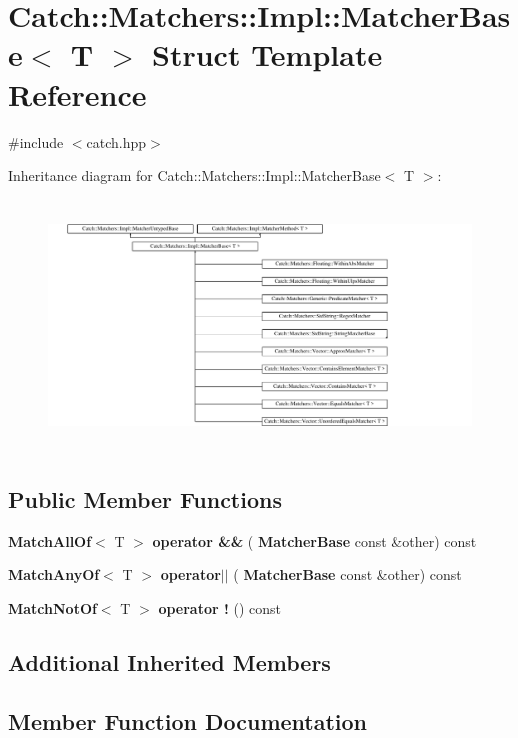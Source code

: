 \section{Catch\+::Matchers\+::Impl\+::Matcher\+Base$<$ T $>$ Struct Template Reference}
\label{struct_catch_1_1_matchers_1_1_impl_1_1_matcher_base}


{\ttfamily \#include $<$catch.\+hpp$>$}

Inheritance diagram for Catch\+::Matchers\+::Impl\+::Matcher\+Base$<$ T $>$\+:\begin{figure}[H]
\begin{center}
\leavevmode
\includegraphics[height=6.646884cm]{struct_catch_1_1_matchers_1_1_impl_1_1_matcher_base}
\end{center}
\end{figure}
\subsection*{Public Member Functions}
\begin{DoxyCompactItemize}
\item 
\textbf{ Match\+All\+Of}$<$ T $>$ \textbf{ operator \&\&} (\textbf{ Matcher\+Base} const \&other) const
\item 
\textbf{ Match\+Any\+Of}$<$ T $>$ \textbf{ operator$\vert$$\vert$} (\textbf{ Matcher\+Base} const \&other) const
\item 
\textbf{ Match\+Not\+Of}$<$ T $>$ \textbf{ operator !} () const
\end{DoxyCompactItemize}
\subsection*{Additional Inherited Members}


\subsection{Member Function Documentation}
\mbox{\label{struct_catch_1_1_matchers_1_1_impl_1_1_matcher_base_ab2ca564bb42ceaf8dbaf3426583bb28e}} 
